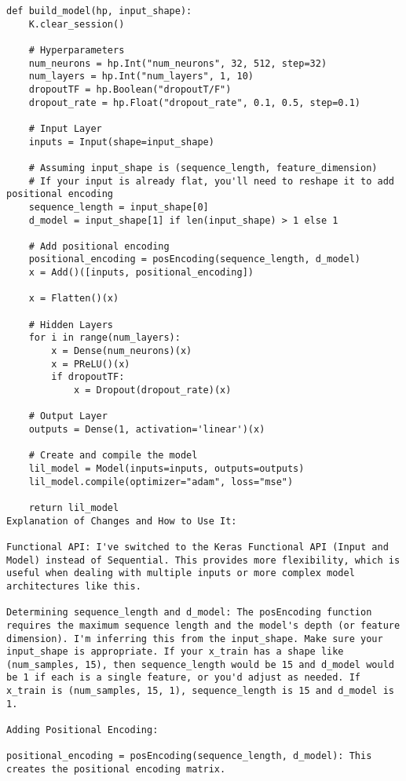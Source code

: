 \documentclass{article}
\begin{document}
\begin{verbatim}
def build_model(hp, input_shape):
    K.clear_session()
    
    # Hyperparameters
    num_neurons = hp.Int("num_neurons", 32, 512, step=32)
    num_layers = hp.Int("num_layers", 1, 10)
    dropoutTF = hp.Boolean("dropoutT/F")
    dropout_rate = hp.Float("dropout_rate", 0.1, 0.5, step=0.1)

    # Input Layer
    inputs = Input(shape=input_shape)
    
    # Assuming input_shape is (sequence_length, feature_dimension)
    # If your input is already flat, you'll need to reshape it to add positional encoding
    sequence_length = input_shape[0] 
    d_model = input_shape[1] if len(input_shape) > 1 else 1
    
    # Add positional encoding
    positional_encoding = posEncoding(sequence_length, d_model)
    x = Add()([inputs, positional_encoding])
    
    x = Flatten()(x)

    # Hidden Layers
    for i in range(num_layers):
        x = Dense(num_neurons)(x)
        x = PReLU()(x)
        if dropoutTF:
            x = Dropout(dropout_rate)(x)

    # Output Layer
    outputs = Dense(1, activation='linear')(x)

    # Create and compile the model
    lil_model = Model(inputs=inputs, outputs=outputs)
    lil_model.compile(optimizer="adam", loss="mse")

    return lil_model
Explanation of Changes and How to Use It:

Functional API: I've switched to the Keras Functional API (Input and Model) instead of Sequential. This provides more flexibility, which is useful when dealing with multiple inputs or more complex model architectures like this.

Determining sequence_length and d_model: The posEncoding function requires the maximum sequence length and the model's depth (or feature dimension). I'm inferring this from the input_shape. Make sure your input_shape is appropriate. If your x_train has a shape like (num_samples, 15), then sequence_length would be 15 and d_model would be 1 if each is a single feature, or you'd adjust as needed. If x_train is (num_samples, 15, 1), sequence_length is 15 and d_model is 1.

Adding Positional Encoding:

positional_encoding = posEncoding(sequence_length, d_model): This creates the positional encoding matrix.


\end{verbatim}
\end{document}
